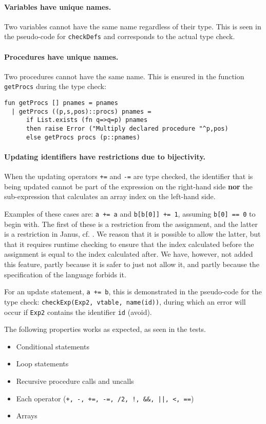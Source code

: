 \paragraph{Variables have unique names.} Two variables cannot have the same name
regardless of their type. This is seen in the pseudo-code for \verb+checkDefs+
and corresponds to the actual type check.

\paragraph{Procedures have unique names.} Two procedures cannot have the same
name. This is ensured in the function \verb+getProcs+ during the type check:

\begin{verbatim}
fun getProcs [] pnames = pnames
  | getProcs ((p,s,pos)::procs) pnames =
      if List.exists (fn q=>q=p) pnames
      then raise Error ("Multiply declared procedure "^p,pos)
      else getProcs procs (p::pnames)
\end{verbatim}

\paragraph{Updating identifiers have restrictions due to bijectivity.} When the
updating operators \verb!+=! and \verb!-=! are type checked, the identifier that
is being updated cannot be part of the expression on the right-hand side {\bf
nor} the sub-expression that calculates an array index on the left-hand side.

Examples of these cases are: \verb!a += a! and \verb!b[b[0]] += 1!, assuming
\verb!b[0] == 0! to begin with. The first of these is a restriction from the
assignment, and the latter is a restriction in Janus, cf. \cite[ch.
2.1]{yokoyama}. We reason that it is possible to allow the latter, but that it
requires runtime checking to ensure that the index calculated before the
assignment is equal to the index calculated after. We have, however, not added
this feature, partly because it is safer to just not allow it, and partly
because the specification of the language forbids it.

For an update statement, \verb!a += b!, this is demonstrated in the pseudo-code
for the type check: \verb+checkExp(Exp2, vtable, name(id))+, during which an
error will occur if \verb+Exp2+ contains the identifier \verb+id+ (avoid).

\vspace{0.2cm}
The following properties works as expected, as seen in the tests.
\begin{itemize}
\item Conditional statements
\item Loop statements
\item Recursive procedure calls and uncalls
\item Each operator ({\tt +, -, +=, -=, /2, !, \&\&, ||,  <, ==})
\item Arrays
\end{itemize}
